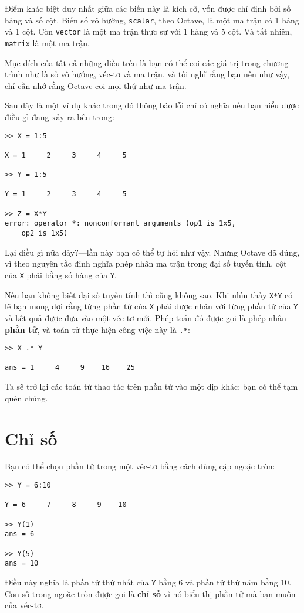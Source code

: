 \documentclass[12pt]{book}
\begin{document}
Điểm khác biệt duy nhất giữa các biến này là kích cỡ, vốn được chỉ định
bởi số hàng và số cột. Biến số vô hướng, {\tt scalar}, theo
Octave, là một ma trận có 1 hàng và 1 cột.  Còn {\tt vector} là
một ma trận thực sự với 1 hàng và 5 cột. Và tất nhiên, 
{\tt matrix} là một ma trận.

Mục đích của tât cả những điều trên là bạn có thể coi các 
giá trị trong chương trình như là số vô hướng, véc-tơ và ma trận,
và tôi nghĩ rằng bạn nên như vậy, chỉ cần nhớ rằng Octave
coi mọi thứ như ma trận.

Sau đây là một ví dụ khác trong đó thông báo lỗi chỉ có nghĩa
nếu bạn hiểu được điều gì đang xảy ra bên trong:

\begin{verbatim}
>> X = 1:5

X = 1     2     3     4     5

>> Y = 1:5

Y = 1     2     3     4     5

>> Z = X*Y
error: operator *: nonconformant arguments (op1 is 1x5,
	op2 is 1x5)
\end{verbatim}
%
Lại điều gì nữa đây?---lần này bạn có thể tự hỏi như vậy. Nhưng
Octave đã đúng, vì theo nguyên tắc định nghĩa phép nhân ma trận
trong đại số tuyến tính, cột của {\tt X} phải bằng số hàng
của {\tt Y}.

Nếu bạn không biết đại số tuyến tính thì cũng không sao. Khi 
nhìn thấy {\tt X*Y} có lẽ bạn mong đợi rằng từng phần tử của
{\tt X} phải được nhân với từng phần tử của 
{\tt Y} và kết quả được đưa vào một véc-tơ mới. Phép toán đó
được gọi là phép nhân {\bf phần tử}, và toán tử thực hiện
công việc này là {\tt .*}:

\begin{verbatim}
>> X .* Y

ans = 1     4     9    16    25
\end{verbatim}
%
Ta sẽ trở lại các toán tử thao tác trên phần tử vào một dịp
khác; bạn có thể tạm quên chúng.




\section{Chỉ số}

Bạn có thể chọn phần tử trong một véc-tơ bằng cách dùng
cặp ngoặc tròn:

\begin{verbatim}
>> Y = 6:10

Y = 6     7     8     9    10

>> Y(1)
ans = 6

>> Y(5)
ans = 10
\end{verbatim}
%
Điều này nghĩa là phần tử thứ nhất của {\tt Y} bằng 6 và
phần tử thứ năm bằng 10. Con số trong ngoặc tròn được gọi
là {\bf chỉ số} vì nó biểu thị phần tử mà bạn muốn của
véc-tơ.
\end{document}
